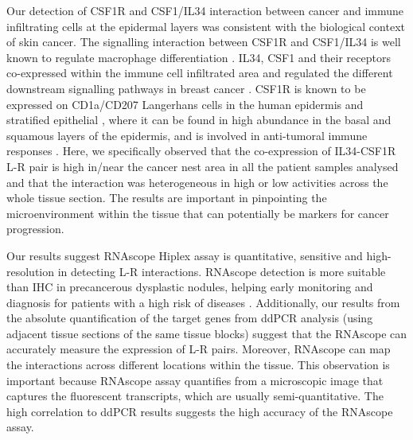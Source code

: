 Our detection of CSF1R and CSF1/IL34 interaction between cancer and immune infiltrating cells at the epidermal layers was consistent with the biological context of skin cancer. The signalling interaction between CSF1R and CSF1/IL34 is well known to regulate macrophage differentiation \cite{lin2008discovery}. IL34, CSF1 and their receptors co-expressed within the immune cell infiltrated area and regulated the different downstream signalling pathways in breast cancer \cite{zins2018differential}. CSF1R is known to be expressed on CD1a/CD207 Langerhans cells in the human epidermis and stratified epithelial \cite{lonardi2020csf1r}, where it can be found in high abundance in the basal and squamous layers of the epidermis, and is involved in anti-tumoral immune responses \cite{pogorzelska2020density}. Here, we specifically observed that the co-expression of IL34-CSF1R L-R pair is high in/near the cancer nest area in all the patient samples analysed and that the interaction was heterogeneous in high or low activities across the whole tissue section. The results are important in pinpointing the microenvironment within the tissue that can potentially be markers for cancer progression.

Our results suggest RNAscope Hiplex assay is quantitative, sensitive and high-resolution in detecting L-R interactions. RNAscope detection is more suitable than IHC in precancerous dysplastic nodules, helping early monitoring and diagnosis for patients with a high risk of diseases \cite{bakheet2020improving}. Additionally, our results from the absolute quantification of the target genes from ddPCR analysis (using adjacent tissue sections of the same tissue blocks) suggest that the RNAscope can accurately measure the expression of L-R pairs. Moreover, RNAscope can map the interactions across different locations within the tissue. This observation is important because RNAscope assay quantifies from a microscopic image that captures the fluorescent transcripts, which are usually semi-quantitative. The high correlation to ddPCR results suggests the high accuracy of the RNAscope assay. 

